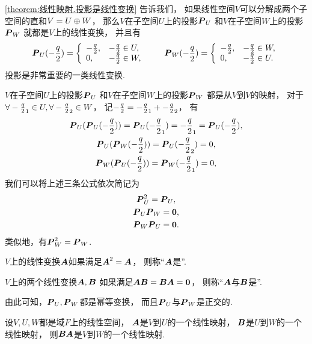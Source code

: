 \cref{theorem:线性映射.投影是线性变换} 告诉我们，
如果线性空间\(V\)可以分解成两个子空间的直和\(V = U \oplus W\)，
那么\(V\)在子空间\(U\)上的投影\(\boldsymbol{P}_U\)
和\(V\)在子空间\(W\)上的投影\(\boldsymbol{P}_W\)
就都是\(V\)上的线性变换，
并且有\begin{equation*}
	\boldsymbol{P}_U(-\frac{q}{2})
	=\left\{ \begin{array}{ll}
		-\frac{q}{2}, & -\frac{q}{2}\in U, \\
		0, & -\frac{q}{2}\in W,
	\end{array} \right.
	\qquad
	\boldsymbol{P}_W(-\frac{q}{2})
	=\left\{ \begin{array}{ll}
		-\frac{q}{2}, & -\frac{q}{2}\in W, \\
		0, & -\frac{q}{2}\in U.
	\end{array} \right.
\end{equation*}
投影是非常重要的一类线性变换.

\(V\)在子空间\(U\)上的投影\(\boldsymbol{P}_U\)
和\(V\)在子空间\(W\)上的投影\(\boldsymbol{P}_W\)
都是从\(V\)到\(V\)的映射，
对于\(\forall-\frac{q}{2}_1\in U,
\forall-\frac{q}{2}_2\in W\)，
记\(-\frac{q}{2}=-\frac{q}{2}_1+-\frac{q}{2}_2\)，
有\begin{gather*}
	\boldsymbol{P}_U(\boldsymbol{P}_U(-\frac{q}{2}))
	=\boldsymbol{P}_U(-\frac{q}{2}_1)
	=-\frac{q}{2}_1
	=\boldsymbol{P}_U(-\frac{q}{2}), \\
	\boldsymbol{P}_U(\boldsymbol{P}_W(-\frac{q}{2}))
	=\boldsymbol{P}_U(-\frac{q}{2}_2)
	=0, \\
	\boldsymbol{P}_W(\boldsymbol{P}_U(-\frac{q}{2}))
	=\boldsymbol{P}_W(-\frac{q}{2}_1)
	=0,
\end{gather*}
我们可以将上述三条公式依次简记为\begin{gather*}
	\boldsymbol{P}_U^2
	=\boldsymbol{P}_U, \\
	\boldsymbol{P}_U \boldsymbol{P}_W
	=\boldsymbol0, \\
	\boldsymbol{P}_W \boldsymbol{P}_U
	=\boldsymbol0.
\end{gather*}
类似地，有\(\boldsymbol{P}_W^2=\boldsymbol{P}_W\).

\(V\)上的线性变换\(\boldsymbol{A}\)如果满足\(\boldsymbol{A}^2=\boldsymbol{A}\)，
则称“\(\boldsymbol{A}\)是”.

\(V\)上的两个线性变换\(\boldsymbol{A},\boldsymbol{B}\)
如果满足\(\boldsymbol{A} \boldsymbol{B}=\boldsymbol{B} \boldsymbol{A}=\boldsymbol0\)，
则称“\(\boldsymbol{A}\)与\(\boldsymbol{B}\)是”.

由此可知，\(\boldsymbol{P}_U,\boldsymbol{P}_W\)都是幂等变换，
而且\(\boldsymbol{P}_U\)与\(\boldsymbol{P}_W\)是正交的.

\begin{proposition}
设\(V,U,W\)都是域\(F\)上的线性空间，
\(\boldsymbol{A}\)是\(V\)到\(U\)的一个线性映射，
\(\boldsymbol{B}\)是\(U\)到\(W\)的一个线性映射，
则\(\boldsymbol{B}\boldsymbol{A}\)是\(V\)到\(W\)的一个线性映射.
\end{proposition}

